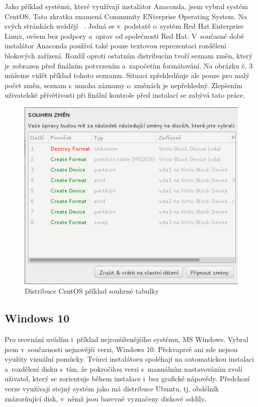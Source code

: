 \documentclass[color,table,oneside,nolot,nolof]{fithesis}
\begin{document}
Jako příklad systémů, které využívají instalátor Anaconda, jsem vybral systém CentOS. Tato zkratka znamená Community ENterprise Operating System. Na svých stránkách uvádějí ~\cite{CentOS}. Jedná se v~podstatě o~systém Red Hat Enterprise 
Linux, ovšem bez podpory a~oprav od společnosti Red Hat. V~současné době instalátor Anaconda používá také pouze textovou reprezentaci rozdělení blokových zařízení. Rozdíl oproti ostatním distribucím tvoří 
seznam změn, který je zobrazen před finálním potvrzením a~započetím formátování. Na obrázku č. 3 můžeme vidět příklad tohoto seznamu. Situaci zpřehledňuje ale pouze pro malý počet změn, seznam s~mnoha 
záznamy o~změnách je nepřehledný. Zlepšením uživatelské přívětivosti při finální kontrole před instalací se zabývá tato práce.

\begin{figure}[h]
	\label{fig:centos2}
	\caption{Distribuce CentOS příklad souhrné tabulky}
	\centering
	\includegraphics[width=.6\columnwidth]{pictures/centos3.jpg}
\end{figure}

\subsection{Windows 10}

Pro srovnání uvádím i~příklad nejrozšířenějšího systému, MS Windows. Vybral jsem v~současnosti nejnovější verzi, Windows 10. Překvapivě ani zde nejsou využity vizuální pomůcky.
Tvůrci instalátoru spoléhají na automatickou instalaci a~rozdělení disku s~tím, že pokročilou verzi s~manuálním nastavováním zvolí uživatel, který se zorientuje během instalace i~bez grafické nápovědy. 
Předchozí verze využívají stejný systém jako má distribuce Ubuntu, tj. obdélník znázorňující disk, v~němž jsou barevně vyznačeny diskové oddíly.
\end{document}
